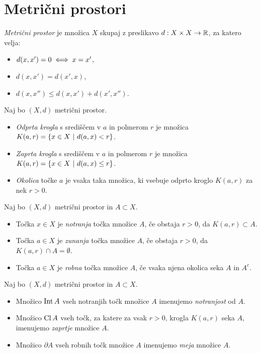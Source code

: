 \section*{Metrični prostori}
\begin{definicija}
    \emph{Metrični prostor} je množica $X$ skupaj z preslikavo $d: X \times X \to \mathbb{R}$, za katero velja:
    \begin{itemize}
        \item $d(x, x') = 0 \iff x=x'$,
        \item $d(x, x') = d(x', x)$,
        \item $d(x, x'') \leq d(x, x') + d(x', x'')$.
    \end{itemize}
\end{definicija}

\begin{definicija}
    Naj bo $(X, d)$ metrični prostor. 
    \begin{itemize}
        \item \emph{Odprta krogla} s središčem v $a$ in polmerom $r$ je množica $K(a, r) = \left\{x \in X \ | \ d(a,x) < r\right\}$.
        \item \emph{Zaprta krogla} s središčem v $a$ in polmerom $r$ je množica $K(a, r) = \left\{x \in X \ | \ d(a,x) \leq r\right\}$. 
        \item \emph{Okolica} točke $a$ je vsaka taka množica, ki vsebuje odprto kroglo $K(a, r)$ za nek $r>0$.
    \end{itemize}    
\end{definicija}

\begin{definicija}
    Naj bo $(X, d)$ metrični prostor in $A \subset X$.
    \begin{itemize}
        \item Točka $x \in X$ je \emph{notranja} točka množice $A$, če obstaja $r>0$, da $K(a,r) \subset A$.
        \item Točka $a \in X$ je \emph{zunanja} točka množice $A$, če obstaja $r>0$, da $K(a,r) \cap A = \emptyset$.
        \item Točka $a \in X$ je \emph{robna} točka množice $A$, če vsaka njena okolica seka $A$ in $A^c$.
    \end{itemize}
\end{definicija}

\begin{definicija}
    Naj bo $(X, d)$ metrični prostor in $A \subset X$.
    \begin{itemize}
        \item Množico $\operatorname{Int} A$ vseh notranjih točk množice $A$ imenujemo \emph{notranjost} od $A$.
        \item Množico $\operatorname{Cl} A$ vseh točk, za katere za vsak $r>0$, krogla $K(a, r)$ seka $A$, imenujemo \emph{zaprtje} množice $A$.
        \item Množico $\partial A$ vseh robnih točk množice $A$ imenujemo \emph{meja} množice $A$.     
    \end{itemize}
\end{definicija}

